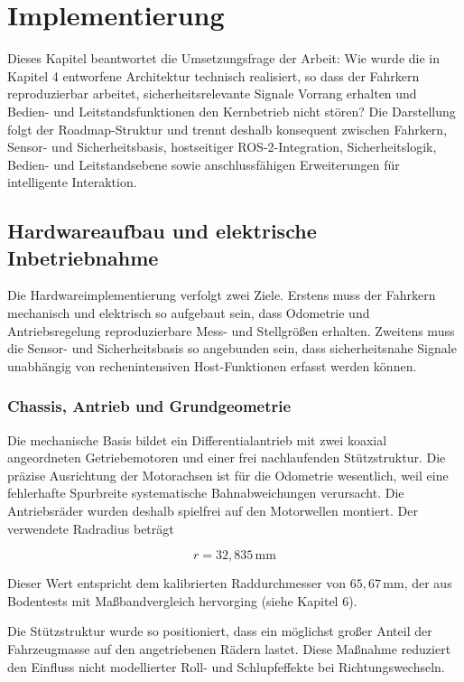 \chapter{Implementierung}

Dieses Kapitel beantwortet die Umsetzungsfrage der Arbeit: Wie wurde die in Kapitel 4 entworfene Architektur technisch realisiert, so dass der Fahrkern reproduzierbar arbeitet, sicherheitsrelevante Signale Vorrang erhalten und Bedien- und Leitstandsfunktionen den Kernbetrieb nicht stören? Die Darstellung folgt der Roadmap-Struktur und trennt deshalb konsequent zwischen Fahrkern, Sensor- und Sicherheitsbasis, hostseitiger ROS-2-Integration, Sicherheitslogik, Bedien- und Leitstandsebene sowie anschlussfähigen Erweiterungen für intelligente Interaktion.

\section{Hardwareaufbau und elektrische Inbetriebnahme}

Die Hardwareimplementierung verfolgt zwei Ziele. Erstens muss der Fahrkern mechanisch und elektrisch so aufgebaut sein, dass Odometrie und Antriebsregelung reproduzierbare Mess- und Stellgrößen erhalten. Zweitens muss die Sensor- und Sicherheitsbasis so angebunden sein, dass sicherheitsnahe Signale unabhängig von rechenintensiven Host-Funktionen erfasst werden können.

\subsection{Chassis, Antrieb und Grundgeometrie}

Die mechanische Basis bildet ein Differentialantrieb mit zwei koaxial angeordneten Getriebemotoren und einer frei nachlaufenden Stützstruktur. Die präzise Ausrichtung der Motorachsen ist für die Odometrie wesentlich, weil eine fehlerhafte Spurbreite systematische Bahnabweichungen verursacht. Die Antriebsräder wurden deshalb spielfrei auf den Motorwellen montiert. Der verwendete Radradius beträgt

$$r = 32{,}835\,\mathrm{mm}$$

Dieser Wert entspricht dem kalibrierten Raddurchmesser von $65{,}67\,\mathrm{mm}$, der aus Bodentests mit Maßbandvergleich hervorging (siehe Kapitel 6).

Die Stützstruktur wurde so positioniert, dass ein möglichst großer Anteil der Fahrzeugmasse auf den angetriebenen Rädern lastet. Diese Maßnahme reduziert den Einfluss nicht modellierter Roll- und Schlupfeffekte bei Richtungswechseln.

